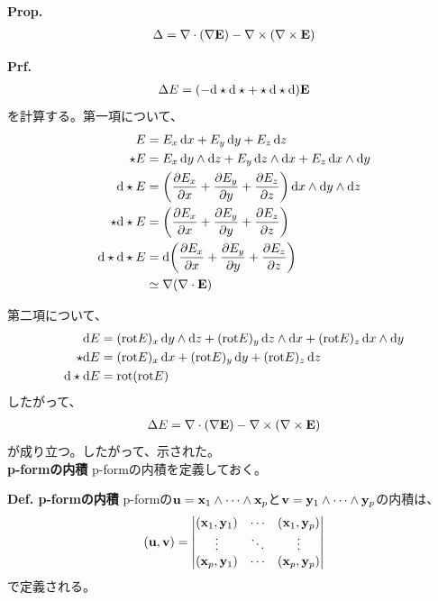 \documentclass[a4paper,11pt]{jsarticle}
\numberwithin{equation}{section}
\begin{document}
\begin{itembox}[l]{\textbf{Prop.}}
  \begin{align}
    \Delta = \nabla \cdot \qty(\nabla \vb{E}) - \nabla \times \qty(\nabla \times \vb{E})
  \end{align}
\end{itembox}
\textbf{Prf.}\\
\begin{align}
  \Delta E = (-\dd \star \dd \star + \star \dd \star \dd)\vb{E}
\end{align}
を計算する。第一項について、
\begin{align}
  E &= E_{x}\dd{x} + E_{y}\dd{y} + E_{z}\dd{z}\\
  \star E &= E_{x}\dd{y}\wedge \dd{z} + E_{y}\dd{z}\wedge \dd{x} + E_{z}\dd{x}\wedge \dd{y}\\
  \dd \star E &= \qty(\pdv{E_{x}}{x}+\pdv{E_{y}}{y}+\pdv{E_{z}}{z})\dd{x}\wedge \dd{y}\wedge \dd{z}\\
  \star \dd \star E &= \qty(\pdv{E_{x}}{x} + \pdv{E_{y}}{y} + \pdv{E_{z}}{z})\\
  \dd \star \dd \star E &= \dd \qty(\pdv{E_{x}}{x} + \pdv{E_{y}}{y} + \pdv{E_{z}}{z})\\
  &\simeq \nabla \qty(\nabla \cdot \vb{E})
\end{align}

第二項について、
\begin{align}
  \dd E &= (\text{rot} E)_x \dd{y}\wedge \dd{z} + (\text{rot} E)_y \dd{z}\wedge \dd{x} + (\text{rot} E)_z \dd{x}\wedge \dd{y}\\
  \star \dd E &= (\text{rot} E)_x \dd{x} + (\text{rot} E)_y \dd{y} + (\text{rot} E)_z \dd{z}\\
  \dd \star \dd E &= \text{rot} \qty(\text{rot} E)
\end{align}
したがって、
\begin{align}
  \Delta E = \nabla \cdot \qty(\nabla \vb{E}) - \nabla \times \qty(\nabla \times \vb{E})
\end{align}
が成り立つ。したがって、示された。\hfill\qedsymbol\\

\textbf{p-formの内積}
p-formの内積を定義しておく。
\begin{itembox}[l]{\textbf{Def. p-formの内積}}
  p-formの$\vb{u} = \vb{x}_1 \wedge \cdots \wedge \vb{x}_p$と$\vb{v} = \vb{y}_1 \wedge \cdots \wedge \vb{y}_p$の内積は、
  \begin{align}
    (\vb{u},\vb{v}) = 
    \begin{vmatrix}
      (\vb{x}_1,\vb{y}_1) & \cdots & (\vb{x}_1,\vb{y}_p)\\
      \vdots & \ddots & \vdots\\
      (\vb{x}_p,\vb{y}_1) & \cdots & (\vb{x}_p,\vb{y}_p)
    \end{vmatrix}
  \end{align}
  で定義される。
\end{itembox}
\end{document}
